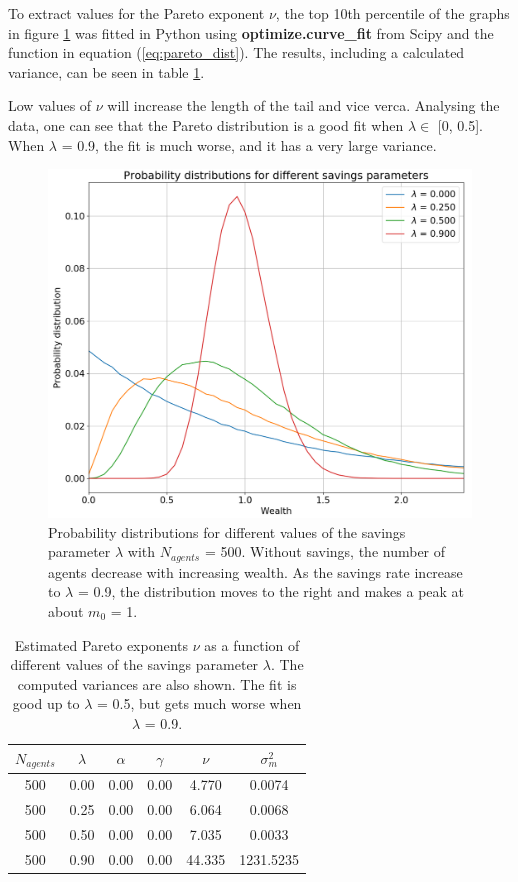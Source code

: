 \documentclass[11pt,a4paper,titlepage]{article}
\begin{document}
To extract values for the Pareto exponent $\nu$, the top 10th percentile of the graphs in figure \ref{fig:c_prob_dist} was fitted in Python using \textbf{optimize.curve\_fit} from Scipy and the function in equation (\ref{eq:pareto_dist}). The results, including a calculated variance, can be seen in table \ref{tab:savings}.

Low values of $\nu$ will increase the length of the tail and vice verca. Analysing the data, one can see that the Pareto distribution is a good fit when $\lambda \in$ [0, 0.5]. When $\lambda$ = 0.9, the fit is much worse, and it has a very large variance. 


\begin{figure}[h!]
\centering
\includegraphics[scale=0.3]{task_c_prob_dist_agents_500_MCC_1000_N_trans_10000000.png}
\caption{ Probability distributions for different values of the savings parameter $\lambda$ with $N_{agents}$ = 500. Without savings, the number of agents decrease with increasing wealth. As the savings rate increase to $\lambda$ = 0.9, the distribution moves to the right and makes a peak at about $m_0$ = 1.  \label{fig:c_prob_dist}}
\end{figure}

\begin{table}[ht!]
\centering
\caption{Estimated Pareto exponents $\nu$ as a function of different values of the savings parameter $\lambda$. The computed variances are also shown. The fit is good up to $\lambda$ = 0.5, but gets much worse when $\lambda$ = 0.9. } \label{tab:savings}
\begin{tabular}{| c | c | c | c | c | c |} \hline
\textbf{$N_{agents}$} & $\lambda$ & $\alpha$ & $\gamma$ &  $\nu$ & $\sigma^2_m$\\ \hline
500 & 0.00 & 0.00 & 0.00 & 4.770 & 0.0074\\ \hline
500 & 0.25 & 0.00 & 0.00 & 6.064 & 0.0068\\ \hline
500 & 0.50 & 0.00 & 0.00 & 7.035 & 0.0033\\ \hline
500 & 0.90 & 0.00 & 0.00 & 44.335 & 1231.5235\\ \hline
\end{tabular}
\end{table}
\end{document}

